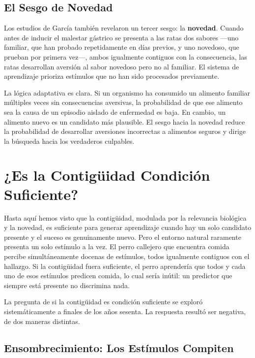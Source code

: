 \documentclass[
  letterpaper,
  DIV=11,
  numbers=noendperiod]{scrreprt}
\begin{document}
\begin{tcolorbox}[enhanced jigsaw, arc=.35mm, bottomrule=.15mm, breakable, colback=white, colframe=quarto-callout-note-color-frame, left=2mm, leftrule=.75mm, opacityback=0, rightrule=.15mm, toprule=.15mm]
\subsection{El Sesgo de Novedad}\label{el-sesgo-de-novedad}

Los estudios de García también revelaron un tercer sesgo: la
\textbf{novedad}. Cuando antes de inducir el malestar gástrico se
presenta a las ratas dos sabores ---uno familiar, que han probado
repetidamente en días previos, y uno novedoso, que prueban por primera
vez---, ambos igualmente contiguos con la consecuencia, las ratas
desarrollan aversión al sabor novedoso pero no al familiar. El sistema
de aprendizaje prioriza estímulos que no han sido procesados
previamente.

La lógica adaptativa es clara. Si un organismo ha consumido un alimento
familiar múltiples veces sin consecuencias aversivas, la probabilidad de
que ese alimento sea la causa de un episodio aislado de enfermedad es
baja. En cambio, un alimento nuevo es un candidato más plausible. El
sesgo hacia la novedad reduce la probabilidad de desarrollar aversiones
incorrectas a alimentos seguros y dirige la búsqueda hacia los
verdaderos culpables.

\section{¿Es la Contigüidad Condición
Suficiente?}\label{es-la-contiguxfcidad-condiciuxf3n-suficiente}

Hasta aquí hemos visto que la contigüidad, modulada por la relevancia
biológica y la novedad, es suficiente para generar aprendizaje cuando
hay un solo candidato presente y el suceso es genuinamente nuevo. Pero
el entorno natural raramente presenta un solo estímulo a la vez. El
perro callejero que encuentra comida percibe simultáneamente docenas de
estímulos, todos igualmente contiguos con el hallazgo. Si la contigüidad
fuera suficiente, el perro aprendería que todos y cada uno de esos
estímulos predicen comida, lo cual sería inútil: un predictor que
siempre está presente no discrimina nada.

La pregunta de si la contigüidad es condición suficiente se exploró
sistemáticamente a finales de los años sesenta. La respuesta resultó ser
negativa, de dos maneras distintas.

\subsection{Ensombrecimiento: Los Estímulos
Compiten}\label{ensombrecimiento-los-estuxedmulos-compiten}


\end{tcolorbox}
\end{document}
